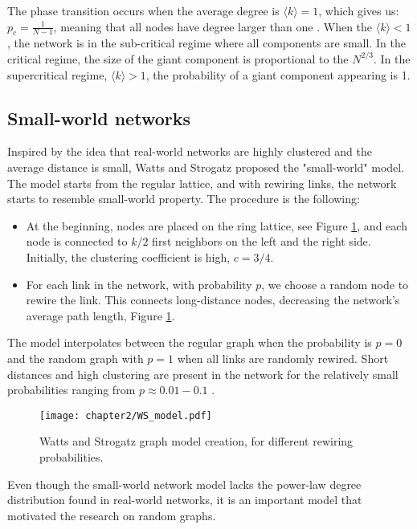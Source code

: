 The phase transition occurs when the average degree is $ \langle k  \rangle = 1$, which gives us: $p_c = \frac{1}{N-1}$, meaning that all nodes have degree larger than one \cite{barabasi2016network}. When the $ \langle k  \rangle < 1$, the network is in the sub-critical regime where all components are small. In the critical regime, the size of the giant component is proportional to the $N^{2/3}$. In the supercritical regime, $ \langle k  \rangle > 1$, the probability of a giant component appearing is 1.

\subsection{Small-world networks}

Inspired by the idea that real-world networks are highly clustered and the average distance is small, Watts and Strogatz \cite{watts1998collective} proposed the "small-world" model. The model starts from the regular lattice, and with rewiring links, the network starts to resemble small-world property. The procedure is the following:

\begin{itemize}
	\item At the beginning, nodes are placed on the ring lattice, see Figure \ref{fig:wsgraph}, and each node is connected to $k/2$ first neighbors on the left and the right side. Initially, the clustering coefficient is high, $c=3/4$. 
	\item For each link in the network, with probability $p$, we choose a random node to rewire the link. This connects long-distance nodes, decreasing the network's average path length, Figure \ref{fig:wsgraph}.
\end{itemize}

The model interpolates between the regular graph when the probability is $p=0$ and the random graph with $p=1$ when all links are randomly rewired. Short distances and high clustering are present in the network for the relatively small probabilities ranging from $p \approx 0.01 - 0.1$ \cite{watts1998collective}. 

\begin{figure}[H]
	\centering
	\texttt{[image: chapter2/WS\_model.pdf]}
	\caption[Watts and Strogatz graph model creation.]{Watts and Strogatz graph model creation, for different rewiring probabilities.}
	\label{fig:wsgraph}
\end{figure}

Even though the small-world network model lacks the power-law degree distribution found in real-world networks, it is an important model that motivated the research on random graphs. 

